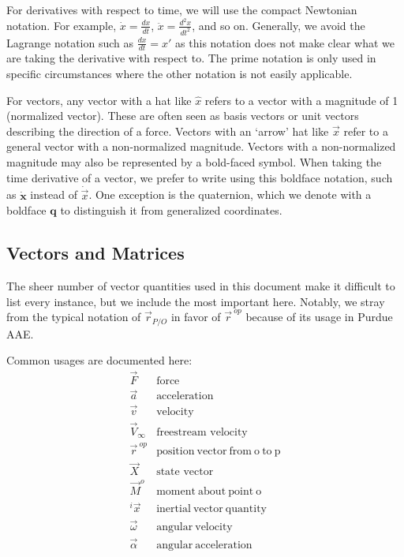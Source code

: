 \documentclass[10pt, openany, titlepage]{book}
\theoremstyle{definition}
\newcounter{example}[chapter]
\begin{document}
For derivatives with respect to time, we will use the compact Newtonian notation. For example, $\dot{x}=\frac{dx}{dt}$, $\ddot{x}=\frac{d^2x}{dt^2}$, and so on. Generally, we avoid the Lagrange notation such as $\frac{dx}{dt}=x'$ as this notation does not make clear what we are taking the derivative with respect to. The prime notation is only used in specific circumstances where the other notation is not easily applicable.

For vectors, any vector with a hat like $\hat{x}$ refers to a vector with a magnitude of 1 (normalized vector). These are often seen as basis vectors or unit vectors describing the direction of a force. Vectors with an ‘arrow’ hat like $\vec{x}$ refer to a general vector with a non-normalized magnitude. Vectors with a non-normalized magnitude may also be represented by a bold-faced symbol. When taking the time derivative of a vector, we prefer to write using this boldface notation, such as $\dot{\textbf{x}}$ instead of $\dot{\vec{x}}$. One exception is the quaternion, which we denote with a boldface $\textbf{q}$ to distinguish it from \glspl{generalized coordinate}.

\subsection*{Vectors and Matrices}
The sheer number of vector quantities used in this document make it difficult to list every instance, but we include the most important here. Notably, we stray from the typical notation of $\vec{r}_{P/O}$ in favor of $\vec{r}^{\ op}$ because of its usage in Purdue AAE.

Common usages are documented here:
$$\begin{array}{ll}
     \vec{F}&  \text{force}\\
     \vec{a}& \text{acceleration}\\
     \vec{v}& \text{velocity}\\
     \vec{V}_\infty&\text{freestream velocity}\\
      \vec{r}^{\ op}& \mathrm{position  \ vector \ from \ o \ to \ p}\\ 
      \vec{X}& \text{state vector}\\
      \vec{M}^{o}& \mathrm{moment\ about\ point\ o}\\
      {}^i\vec{x}& \mathrm{inertial\ vector\ quantity}\\
      \vec{\omega}&\mathrm{angular \ velocity}\\
       \vec{\alpha}& \mathrm{angular \ acceleration}\\
\end{array}$$
\end{document}
